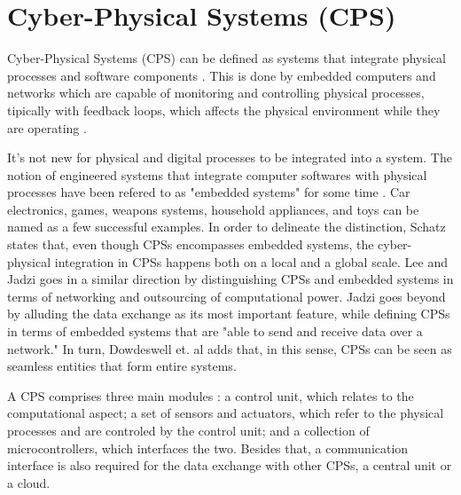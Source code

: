 \section{Cyber-Physical Systems (CPS)}  \label{sec:bgCPS}

Cyber-Physical Systems (CPS) can be defined as systems that integrate physical processes and software components \cite{lee2008cyber}. This is done by embedded computers and networks which are capable of monitoring and controlling physical processes, tipically with feedback loops, which affects the physical environment while they are operating \cite{banerjee2011ensuring}.


It's not new for physical and digital processes to be integrated into a system. The notion of engineered systems that integrate computer softwares with physical processes have been refered to as "embedded systems" for some time \cite{lee2008cyber}. Car electronics, games, weapons systems, household appliances, and toys can be named as a few successful examples. In order to delineate the distinction, Schatz \cite{schatz2014role} states that, even though CPSs encompasses embedded systems, the cyber-physical integration in CPSs happens both on a local and a global scale. Lee \cite{lee2008cyber} and Jadzi \cite{jazdi2014cyber} goes in a similar direction by distinguishing CPSs and embedded systems in terms of networking and outsourcing of computational power. Jadzi \cite{jazdi2014cyber} goes beyond by alluding the data exchange as its most important feature, while defining CPSs in terms of embedded systems that are "able to send and receive data over a network." In turn, Dowdeswell et. al \cite{dowdeswell2020finding} adds that, in this sense, CPSs can be seen as seamless entities that form entire systems.

A CPS comprises three main modules \cite{jazdi2014cyber}: a control unit, which relates to the computational aspect; a set of sensors and actuators, which refer to the physical processes and are controled by the control unit; and a collection of microcontrollers, which interfaces the two. Besides that, a communication interface is also required for the data exchange with other CPSs, a central unit or a cloud. 

